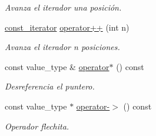\begin{DoxyCompactItemize}
\begin{DoxyCompactList}\small\item\em Avanza el iterador una posición. \end{DoxyCompactList}\item 
\mbox{\hyperlink{classstring__map_1_1const__iterator}{const\+\_\+iterator}} \mbox{\hyperlink{classstring__map_1_1const__iterator_ac4da309759fa2dd7d73eeef070b9ec0e}{operator++}} (int n)
\begin{DoxyCompactList}\small\item\em Avanza el iterador n posiciones. \end{DoxyCompactList}\item 
const value\+\_\+type \& \mbox{\hyperlink{classstring__map_1_1const__iterator_ab66744c4e3de4aebf417e40b3f0142e6}{operator$\ast$}} () const
\begin{DoxyCompactList}\small\item\em Desreferencia el puntero. \end{DoxyCompactList}\item 
const value\+\_\+type $\ast$ \mbox{\hyperlink{classstring__map_1_1const__iterator_acc35ff68cf856fc4cdaacf5b41c37714}{operator-\/$>$}} () const
\begin{DoxyCompactList}\small\item\em Operador flechita. \end{DoxyCompactList}\end{DoxyCompactItemize}
